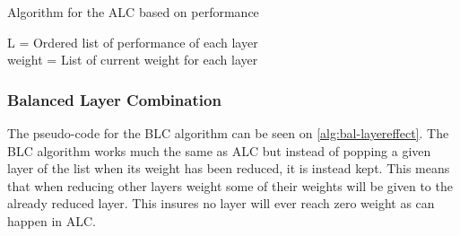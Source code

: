 \begin{algorithm}
    \caption{Algorithm for the ALC based on performance}
    \SetAlgoLined
    L = Ordered list of performance of each layer \\
    weight  = List of current weight for each layer \\
    \label{alg:aggresive-layereffect}
\end{algorithm}

\subsubsection{Balanced Layer Combination}
The pseudo-code for the BLC algorithm can be seen on \autoref{alg:bal-layereffect}.
The BLC algorithm works much the same as ALC but instead of popping a given layer of the list when its weight has been reduced, it is instead kept.
This means that when reducing other layers weight some of their weights will be given to the already reduced layer.
This insures no layer will ever reach zero weight as can happen in ALC.

